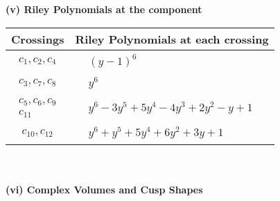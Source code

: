 \documentclass[1p]{elsarticle_modified}
\theoremstyle{definition}
\begin{document}
\newpage\renewcommand{\arraystretch}{1}
\flushleft \textbf{(v) Riley Polynomials at the component}\newline \\
\begin{tabular}{m{50pt}|m{274pt}}
Crossings & \hspace{64pt}Riley Polynomials at each crossing \\
\hline $$\begin{aligned}c_{1},c_{2},c_{4}\end{aligned}$$&$\begin{aligned}
&(y-1)^6
\end{aligned}$\\
\hline $$\begin{aligned}c_{3},c_{7},c_{8}\end{aligned}$$&$\begin{aligned}
&y^6
\end{aligned}$\\
\hline $$\begin{aligned}c_{5},c_{6},c_{9}\\c_{11}\end{aligned}$$&$\begin{aligned}
&y^6-3 y^5+5 y^4-4 y^3+2 y^2- y+1
\end{aligned}$\\
\hline $$\begin{aligned}c_{10},c_{12}\end{aligned}$$&$\begin{aligned}
&y^6+y^5+5 y^4+6 y^2+3 y+1
\end{aligned}$\\
\hline
\end{tabular}\\~\\
\newpage\flushleft \textbf{(vi) Complex Volumes and Cusp Shapes}
\end{document}

